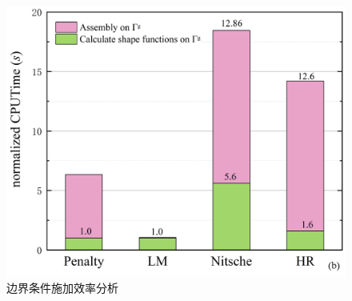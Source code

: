 \begin{figure}[H]
    \centering
    \includegraphics[scale=0.5]{figure/EHR/cantilever/efficiency.png}
    \caption{边界条件施加效率分析}\label{Cefficiency}
\end{figure}

